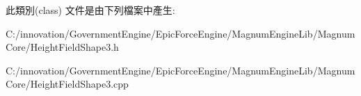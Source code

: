 此類別(class) 文件是由下列檔案中產生\+:\begin{DoxyCompactItemize}
\item 
C\+:/innovation/\+Government\+Engine/\+Epic\+Force\+Engine/\+Magnum\+Engine\+Lib/\+Magnum\+Core/Height\+Field\+Shape3.\+h\item 
C\+:/innovation/\+Government\+Engine/\+Epic\+Force\+Engine/\+Magnum\+Engine\+Lib/\+Magnum\+Core/Height\+Field\+Shape3.\+cpp\end{DoxyCompactItemize}
